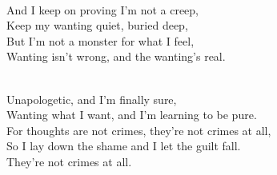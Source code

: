 \begin{lyrics}
\\
And I keep on proving I'm not a creep,\\
Keep my wanting quiet, buried deep,\\
But I'm not a monster for what I feel,\\
Wanting isn't wrong, and the wanting's real.

\\
Unapologetic, and I'm finally sure,\\
Wanting what I want, and I'm learning to be pure.\\
For thoughts are not crimes, they're not crimes at all,\\
So I lay down the shame and I let the guilt fall.
\\
They're not crimes at all.

\end{lyrics}

